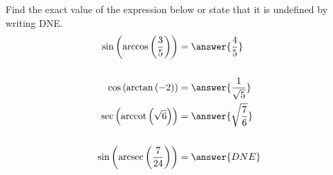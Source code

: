 \documentclass{ximera}
\author{Bobby Ramsey}
\begin{document}
\begin{exercise}


Find the exact value of the expression below or state that it is undefined by writing DNE.
\begin{align*}
	\sin\left( \arccos\left( \frac{3}{5} \right) \right) &= \answer{\frac{4}{5}} \\ \\
	\cos\left( \arctan\left(-2\right) \right) &= \answer{\frac{1}{\sqrt{5}}} \\
	\sec\left(\arccot\left(\sqrt{6}\right)\right)&=\answer{\sqrt{\frac{7}{6}}}\\ \\
	\sin\left( \arcsec\left( \frac{7}{24} \right) \right) &= \answer{DNE} \\ \\
\end{align*}


\end{exercise}
\end{document}
